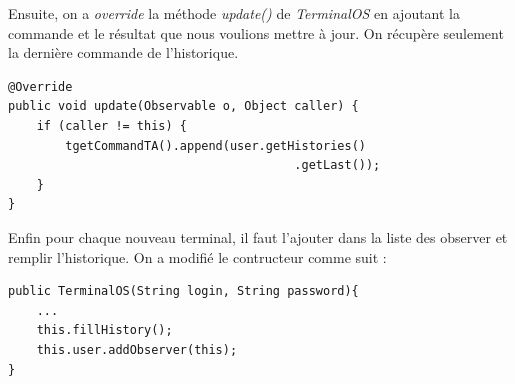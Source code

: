 Ensuite, on a \emph{override} la méthode \emph{update()} de \emph{TerminalOS} en ajoutant la commande et le résultat que nous voulions mettre à jour. On récupère seulement la dernière commande de l'historique.

\begin{lstlisting}
@Override
public void update(Observable o, Object caller) {
	if (caller != this) {
		tgetCommandTA().append(user.getHistories()
										.getLast());
	}
}
\end{lstlisting}

Enfin pour chaque nouveau terminal, il faut l'ajouter dans la liste des observer et remplir l'historique. On a modifié le contructeur comme suit :

\begin{lstlisting}
public TerminalOS(String login, String password){
	...
	this.fillHistory();
	this.user.addObserver(this);
}
\end{lstlisting}

